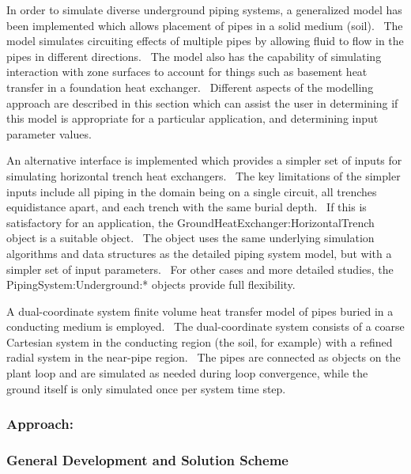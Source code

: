 In order to simulate diverse underground piping systems, a generalized model has been implemented which allows placement of pipes in a solid medium (soil).~ The model simulates circuiting effects of multiple pipes by allowing fluid to flow in the pipes in different directions.~ The model also has the capability of simulating interaction with zone surfaces to account for things such as basement heat transfer in a foundation heat exchanger.~ Different aspects of the modelling approach are described in this section which can assist the user in determining if this model is appropriate for a particular application, and determining input parameter values.

An alternative interface is implemented which provides a simpler set of inputs for simulating horizontal trench heat exchangers.~ The key limitations of the simpler inputs include all piping in the domain being on a single circuit, all trenches equidistance apart, and each trench with the same burial depth.~ If this is satisfactory for an application, the GroundHeatExchanger:HorizontalTrench object is a suitable object.~ The object uses the same underlying simulation algorithms and data structures as the detailed piping system model, but with a simpler set of input parameters.~ For other cases and more detailed studies, the PipingSystem:Underground:* objects provide full flexibility.

A dual-coordinate system finite volume heat transfer model of pipes buried in a conducting medium is employed.~ The dual-coordinate system consists of a coarse Cartesian system in the conducting region (the soil, for example) with a refined radial system in the near-pipe region.~ The pipes are connected as objects on the plant loop and are simulated as needed during loop convergence, while the ground itself is only simulated once per system time step.

\subsubsection{Approach:}\label{approach-002}

\subsubsection{General Development and Solution Scheme}\label{general-development-and-solution-scheme}

